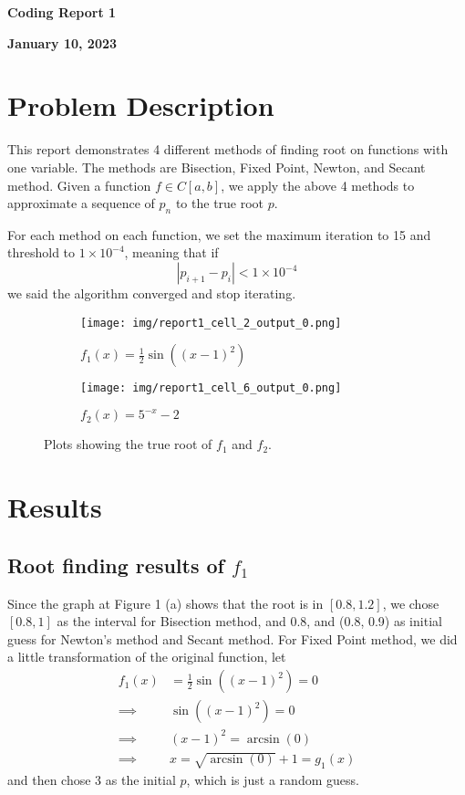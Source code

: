 \documentclass[a4paper,12pt]{article}
\begin{document}
\begin{center} %
	{\Large \bf Coding Report 1} %
	\vspace{2mm}
	
       
	{\bf January 10, 2023}
\end{center}  

\vspace{0.4cm}


\section{Problem Description}
This report demonstrates 4 different methods of finding root on functions with one variable.
The methods are Bisection, Fixed Point, Newton, and Secant method.
Given a function $f \in C[a, b]$, 
we apply the above 4 methods to approximate a sequence of $p_n$ to the true root $p$.

For each method on each function,
we set the maximum iteration to 15 and threshold to $1 \times 10^{-4}$,
meaning that if
$$
|p_{i+1} - p_{i}| < 1 \times 10^{-4}
$$
we said the algorithm converged and stop iterating.


\begin{figure}[H]
    \centering
	\begin{subfigure}[b]{0.49\textwidth}
	    \centering
	    \texttt{[image: img/report1\_cell\_2\_output\_0.png]}
	    \caption{$f_1(x) = \frac{1}{2}\sin((x - 1)^2)$}
	    \label{fig:0}
	\end{subfigure}
	\hfill
	\begin{subfigure}[b]{0.49\textwidth}
	    \centering
	     \texttt{[image: img/report1\_cell\_6\_output\_0.png]}
	     \caption{$f_2(x) = 5^{-x} - 2$}
	     \label{fig:1}
	\end{subfigure}
	\caption{Plots showing the true root of $f_1$ and $f_2$.}
\end{figure}


\section{Results}

\subsection{Root finding results of $f_1$}


Since the graph at Figure 1 (a) shows that the root is in $[0.8, 1.2]$,
we chose $[0.8, 1]$ as the interval for Bisection method,
and 0.8, and (0.8, 0.9) as initial guess for Newton's method and Secant method.
For Fixed Point method, we did a little transformation of the original function,
let
$$
\begin{aligned}
f_{1}(x) & = \frac{1}{2}\sin((x - 1)^2) = 0 \\
\implies & \sin((x - 1)^2) = 0 \\
\implies & (x - 1)^2 = \arcsin(0) \\
\implies & x = \sqrt{\arcsin(0)} + 1 = g_1(x)
\end{aligned}
$$
and then chose 3 as the initial $p$, which is just a random guess.
\end{document}
